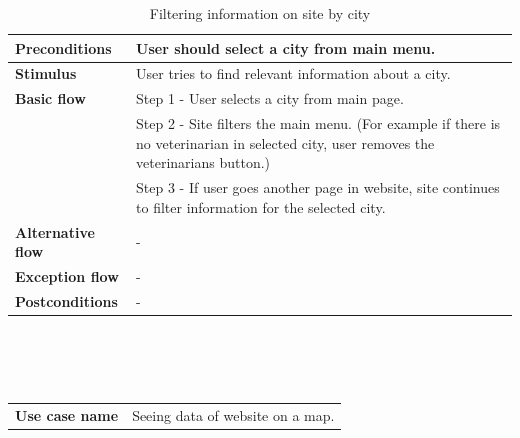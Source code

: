 \begin{center}
\begin{table}[H]
\begin{tabular}{| m{3cm}| m{10cm} |}
            \hline
            \textbf{Preconditions}    & User should select a city from main menu.                                                                                               \\
            \hline
            \textbf{Stimulus}         & User tries to find relevant information about a city.                                                                                   \\
            \hline
            \textbf{Basic flow}       & Step 1 - User selects a city from main page.                                                                                            \\
                                      & Step 2 - Site filters the main menu. (For example if there is no veterinarian in selected city, user removes the veterinarians button.) \\
                                      & Step 3 - If user goes another page in website, site continues to filter information for the selected city.                              \\
            \hline
            \textbf{Alternative flow} & -                                                                                                                                       \\
            \hline
            \textbf{Exception flow}   & -                                                                                                                                       \\
            \hline
            \textbf{Postconditions}   & -                                                                                                                                       \\
            \hline
        \end{tabular}
        \caption[Filtering information on site by city]{Filtering information on site by city}
    \end{table}
    ~\\~\\~\\
    \begin{table}[H]
        \begin{tabular}{| m{3cm}| m{10cm} |}
            \hline
            \textbf{Use case name}    & Seeing data of website on a map.                                                                                                           \\

\end{tabular}
\end{table}
\end{center}
